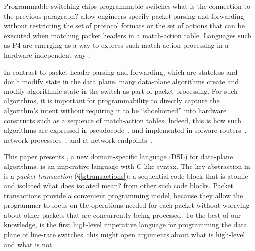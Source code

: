 Programmable switching chips \ac{programmable switches}
\ac{what is the connection to the previous paragraph?}
allow engineers specify packet parsing and
forwarding without restricting the set of protocol formats or the set
of actions that can be executed when matching packet headers in a
match-action table. Languages such as P4 are emerging as a way to
express such match-action processing in a hardware-independent
way~\cite{p4,p4spec,dc_p4}.


In contrast to packet header parsing and forwarding, which are stateless
and don't modify state in the data plane, many data-plane algorithms
create and modify algorithmic state in the switch as part of packet
processing. For such algorithms, it is important for programmability to
directly capture the algorithm's intent without requiring it to be
``shoehorned'' into hardware constructs such as a sequence of
match-action tables. Indeed, this is how such algorithms are expressed
in pseudocode~\cite{red, csfq, codel_code, avq, blue}, and implemented
in sofware routers~\cite{click, dpdk, routebricks}, network
processors~\cite{packetc, nova}, and at network
endpoints~\cite{qdisc}.

This paper presents \pktlanguage, a new domain-specific language (DSL)
for data-plane algorithms.  \pktlanguage is an imperative language
with C-like syntax. The key abstraction in \pktlanguage is a {\em
  packet transaction} (\S\ref{s:transactions}): a sequential code
block that is atomic and isolated \ac{what does isolated mean?}
from other such code blocks. Packet
transactions provide a convenient programming model, because they
allow the programmer to focus on the operations needed for each packet
without worrying about other packets that are concurrently being
processed. To the best of our knowledge, \pktlanguage is the first
high-level imperative language for programming the data plane of
line-rate switches. \ac{this might open arguments about what is high-level
and what is not}


